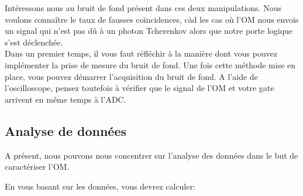 Intéressons nous au bruit de fond présent dans ces deux manipulations. Nous voulons connaître le taux de fausses coïncidences, càd les cas où l'OM nous envois un signal qui n'est pas dû à un photon Tcherenkov alors que notre porte logique s'est déclenchée. \\

Dans un premier temps, il vous faut réfléchir à la manière dont vous pouvez implémenter la prise de mesure du bruit de fond. Une fois cette méthode mise en place, vous pouvez démarrer l'acquisition du bruit de fond. A l'aide de l'oscilloscope, pensez toutefois à vérifier que le signal de l'OM et votre gate arrivent en même temps à l'ADC.


\subsection{Analyse de donn\'ees}

A pr\'esent, nous pouvons nous concentrer sur l'analyse des donn\'ees dans le but de caract\'eriser l'OM.

En vous basant sur les donn\'ees, vous devrez calculer:
\begin{center}
\end{center}

